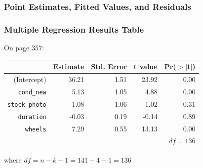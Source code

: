 \documentclass[handout]{beamer}
\newcommand{\blue}[1]{\textcolor{blue2}{#1}}
\begin{document}
\begin{frame}[fragile]
\frametitle{Point Estimates, Fitted Values, and Residuals}
%
%
%
%

\end{frame}


\begin{frame}[fragile]
\frametitle{Multiple Regression Results Table}

On page 357:
\begin{table}[ht]
\centering
\begin{tabular}{r|rrrr}
  \hline
 & Estimate & Std. Error & t value & Pr($>$$|$t$|$) \\ 
  \hline
(Intercept) & 36.21 & 1.51 & 23.92 & 0.00 \\ 
{\tt cond\_new} & 5.13 & 1.05 & 4.88 & 0.00 \\ 
{\tt stock\_photo} & 1.08 & 1.06 & 1.02 & 0.31 \\ 
{\tt duration} & -0.03 & 0.19 & -0.14 & 0.89 \\ 
{\tt wheels} & 7.29 & 0.55 & 13.13 & 0.00 \\ 
   \hline
   & & & & $df=136$\\
\end{tabular}
\end{table}
where $df=n-k-1=141-4-1=136$
\end{frame}


%
%
\end{document}

